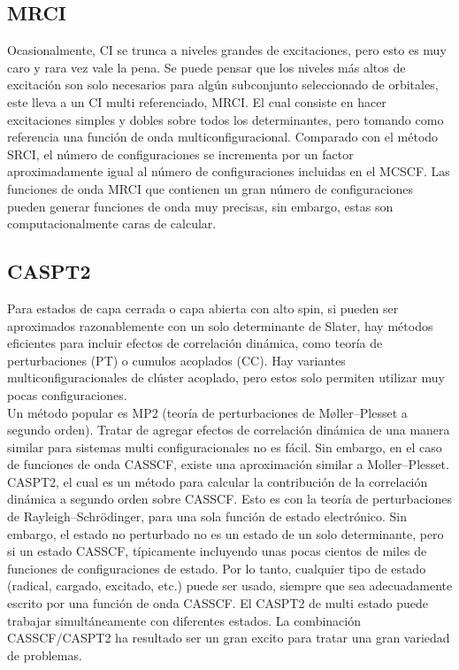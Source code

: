 \documentclass[12pt]{report}
\begin{document}
\subsection{MRCI}
Ocasionalmente, CI se trunca a niveles grandes de excitaciones, pero esto es muy caro y rara vez vale la pena. Se puede pensar que los niveles más altos de excitación son solo necesarios para algún subconjunto seleccionado de orbitales, este lleva a un CI multi referenciado, MRCI. El cual consiste en hacer excitaciones simples y dobles sobre todos los determinantes, pero tomando como referencia una función de onda multiconfiguracional. Comparado con el método SRCI, el número de configuraciones se incrementa por un factor aproximadamente igual al número de configuraciones incluidas en el MCSCF. Las funciones de onda MRCI que contienen un gran número de configuraciones pueden generar funciones de onda muy precisas, sin embargo, estas son computacionalmente caras de calcular.


\subsection{CASPT2}
Para estados de capa cerrada o capa abierta con alto spin, si pueden ser aproximados razonablemente con un solo determinante de Slater, hay métodos eficientes para incluir efectos de correlación dinámica, como teoría de perturbaciones (PT) o cumulos acoplados (CC). Hay variantes multiconfiguracionales de clúster acoplado, pero estos solo permiten utilizar muy pocas configuraciones.
\\


Un método popular es MP2 (teoría de perturbaciones de M\o ller–Plesset a segundo orden). Tratar de agregar efectos de correlación dinámica de una manera similar para sistemas multi configuracionales no es fácil. Sin embargo, en el caso de funciones de onda CASSCF, existe una aproximación similar a Moller–Plesset. CASPT2, el cual es un método para calcular la contribución de la correlación dinámica a segundo orden sobre CASSCF. Esto es con la teoría de perturbaciones de Rayleigh–Schrödinger, para una sola función de estado electrónico. Sin embargo, el estado no perturbado no es un estado de un solo determinante, pero si un estado CASSCF, típicamente incluyendo unas pocas cientos de miles de funciones de configuraciones de estado. Por lo tanto, cualquier tipo de estado (radical, cargado, excitado, etc.) puede ser usado, siempre que sea adecuadamente escrito por una función de onda CASSCF. El CASPT2 de multi estado puede trabajar simultáneamente con diferentes estados. La combinación CASSCF/CASPT2 ha resultado ser un gran excito para tratar una gran variedad de problemas. 
\newpage
\end{document}

